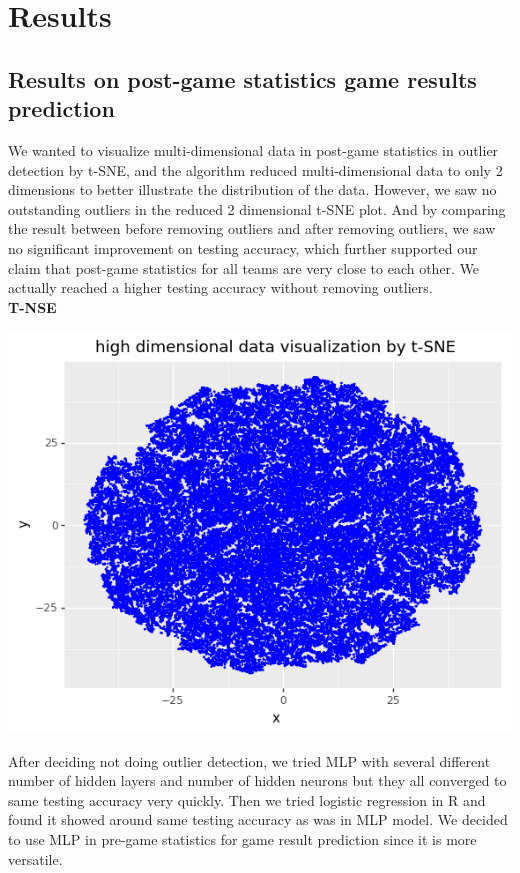 \documentclass[12pt]{article}
\begin{document}
\section{Results}
\subsection{Results on post-game statistics game results prediction}
\quad We wanted to visualize multi-dimensional data in post-game statistics in outlier detection by t-SNE, and the algorithm reduced multi-dimensional data to only 2 dimensions to better illustrate the distribution of the data. However, we saw no outstanding outliers in the reduced 2 dimensional t-SNE plot. And by comparing the result between before removing outliers and after removing outliers, we saw no significant improvement on testing accuracy, which further supported our claim that post-game statistics for all teams are very close to each other. We actually reached a higher testing accuracy without removing outliers. \\

\textbf{T-NSE}

\includegraphics[scale=0.9]{tsne.png} 

\quad After deciding not doing outlier detection, we tried MLP with several different number of hidden layers and number of hidden neurons but they all converged to same testing accuracy very quickly. Then we tried logistic regression in R and found it showed around same testing accuracy as was in MLP model. We decided to use MLP in pre-game statistics for game result prediction since it is more versatile.
\end{document}
